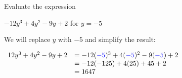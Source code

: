 \documentclass{ximera}
\begin{document}
\begin{example}
Evaluate the expression 
\begin{center}
$-12y^3+4y^2-9y+2$ for $y=-5$ 
\end{center}
\begin{explanation}
  We will replace $y$ with $-5$ and simplify the result:
\begin{center}
$
\begin{array}{cl}
   12y^3+4y^2-9y+2 & = -12({\color{blue}{{-5}}})^3+4({\color{blue}{{-5}}})^2-9({\color{blue}{{-5}}})+2\\
      & = -12(-125)+4(25)+45+2 \\
        & = 1647  \\
\end{array}
$
\end{center}
\end{explanation}
\end{example}
\end{document}
